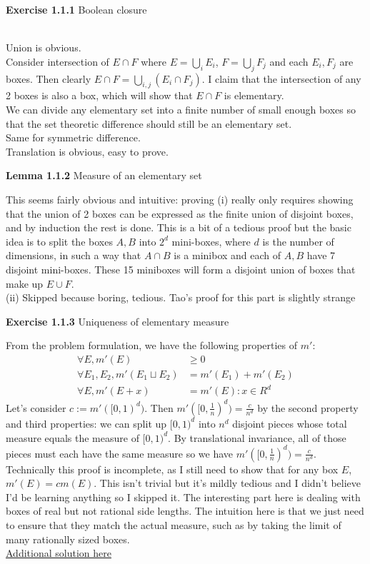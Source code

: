 \documentclass[answers,12pt]{exam}
\begin{document}
\textbf{Exercise 1.1.1} Boolean closure
\begin{solution}\\
Union is obvious.\\
Consider intersection of $E \cap F$ where $E = \bigcup_i E_i$, $F = \bigcup_j F_j$ and each $E_i, F_j$ are boxes.
Then clearly $E \cap F = \bigcup_{i,j}(E_i \cap F_j)$.
I claim that the intersection of any 2 boxes is also a box, which will show that $E \cap F$ is elementary. \\
We can divide any elementary set into a finite number of small enough boxes so that the set theoretic difference should still be an elementary set.\\
Same for symmetric difference.\\
Translation is obvious, easy to prove.
\end{solution}
\textbf{Lemma 1.1.2} Measure of an elementary set 
\begin{solution}
This seems fairly obvious and intuitive: proving (i) really only requires showing that the union of 2 boxes can be expressed as the finite union of disjoint boxes, and by induction the rest is done. 
This is a bit of a tedious proof but the basic idea is to split the boxes $A,B$ into $2^d$ mini-boxes, where $d$ is the number of dimensions, in such a way that $A\cap B$ is a minibox and each of $A,B$ have 7 disjoint mini-boxes. 
These 15 miniboxes will form a disjoint union of boxes that make up $E \cup F$. \\
(ii) Skipped because boring, tedious.
Tao's proof for this part is slightly strange
\end{solution}

\textbf{Exercise 1.1.3} Uniqueness of elementary measure
\begin{solution}
    From the problem formulation, we have the following properties of $m'$: 
    \[
        \begin{aligned}
        \forall E, m'(E) &\geq 0\\
        \forall E_1, E_2, m'(E_1\sqcup E_2) &= m'(E_1)+m'(E_2)\\
        \forall E, m'(E+x) &= m'(E): x \in R^d
        \end{aligned}
    \]
    Let's consider $c:=m'([0,1)^d)$. 
    Then $m'([0,\frac{1}{n})^d) = \frac{c}{n^d}$ by the second property and third properties: 
    we can split up $[0,1)^d$ into $n^d$ disjoint pieces whose total measure equals the measure of $[0,1)^d$.
    By translational invariance, all of those pieces must each have the same measure so we have $m'([0,\frac{1}{n})^d) = \frac{c}{n^d}$.\\
    Technically this proof is incomplete, as I still need to show that for any box $E$, $m'(E) = cm(E)$.
    This isn't trivial but it's mildly tedious and I didn't believe I'd be learning anything so I skipped it. 
    The interesting part here is dealing with boxes of real but not rational side lengths. 
    The intuition here is that we just need to ensure that they match the actual measure, such as by taking the limit of many rationally sized boxes.\\
    \href{https://math.solverer.com/library/terence_tao/an_introduction_to_measure_theory/exercise_1-1-3}{Additional solution here}
\end{solution}
\end{document}

